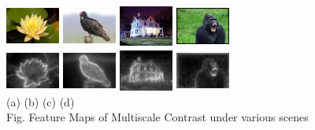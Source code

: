 \documentclass[10pt,twocolumn,letterpaper]{article}
\newcommand{\hs}{\hspace{0.58in}}
\begin{document}
    \begin{center}
    \includegraphics[width=0.7in,height=0.54in]{./Figures/contrast/1orig.jpg}
    \includegraphics[width=0.7in,height=0.54in]{./Figures/contrast/2orig.jpg}
    \includegraphics[width=0.7in,height=0.54in]{./Figures/contrast/3orig.jpg}
    \includegraphics[width=0.7in,height=0.54in]{./Figures/contrast/4orig.jpg}\\
    \includegraphics[width=0.7in,height=0.54in]{./Figures/contrast/1cont.jpg}
    \includegraphics[width=0.7in,height=0.54in]{./Figures/contrast/2cont.jpg}
    \includegraphics[width=0.7in,height=0.54in]{./Figures/contrast/3cont.jpg}
    \includegraphics[width=0.7in,height=0.54in]{./Figures/contrast/4cont.jpg}\\
    \footnotesize \hspace{0.1cm} (a) \hs (b) \hs  (c) \hs (d) \\
     Fig. Feature Maps of Multiscale Contrast under various scenes
    \end{center}
\end{document}
